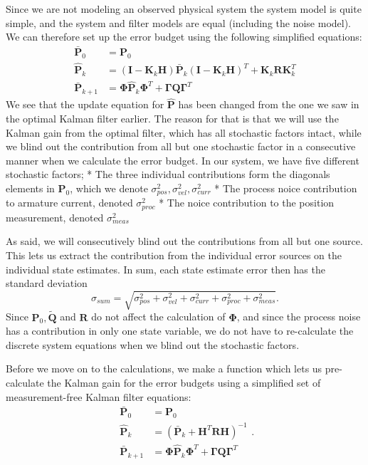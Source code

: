\documentclass[11pt]{article}
\begin{document}
Since we are not modeling an observed physical system the system model
is quite simple, and the system and filter models are equal (including
the noise model). We can therefore set up the error budget using the
following simplified equations: \[
\begin{aligned}
\bar{\mathbf{P}}_0 &= \mathbf{P}_0 \\
\hat{\mathbf{P}}_k &= (\mathbf{I} - \mathbf{K}_k \mathbf{H}) \bar{\mathbf{P}}_k (\mathbf{I} - \mathbf{K}_k \mathbf{H})^T + \mathbf{K}_k \mathbf{R} \mathbf{K}_k^T \\
\bar{\mathbf{P}}_{k+1} &= \mathbf{\Phi} \hat{\mathbf{P}}_k \mathbf{\Phi}^T + \mathbf{\Gamma} \mathbf{Q} \mathbf{\Gamma}^T
\end{aligned}
\] We see that the update equation for \(\hat{\mathbf{P}}\) has been
changed from the one we saw in the optimal Kalman filter earlier. The
reason for that is that we will use the Kalman gain from the optimal
filter, which has all stochastic factors intact, while we blind out the
contribution from all but one stochastic factor in a consecutive manner
when we calculate the error budget. In our system, we have five
different stochastic factors; * The three individual contributions form
the diagonals elements in \(\mathbf{P}_0\), which we denote
\(\sigma_{pos}^2, \sigma_{vel}^2, \sigma_{curr}^2\) * The process noice
contribution to armature current, denoted \(\sigma_{proc}^2\) * The
noice contribution to the position measurement, denoted
\(\sigma_{meas}^2\)

As said, we will consecutively blind out the contributions from all but
one source. This lets us extract the contribution from the individual
error sources on the individual state estimates. In sum, each state
estimate error then has the standard deviation \[
\hat{\sigma}_{sum} = \sqrt{\sigma_{pos}^2 + \sigma_{vel}^2 + \sigma_{curr}^2 + \sigma_{proc}^2 + \sigma_{meas}^2}.
\] Since \(\mathbf{P}_0, \tilde{\mathbf{Q}}\) and \(\mathbf{R}\) do not
affect the calculation of \(\mathbf{\Phi}\), and since the process noise
has a contribution in only one state variable, we do not have to
re-calculate the discrete system equations when we blind out the
stochastic factors.

Before we move on to the calculations, we make a function which lets us
pre-calculate the Kalman gain for the error budgets using a simplified
set of measurement-free Kalman filter equations: \[
\begin{aligned}
\bar{\mathbf{P}}_0 &= \mathbf{P}_0 \\
\hat{\mathbf{P}}_k &= (\bar{\mathbf{P}}_k + \mathbf{H}^T \mathbf{RH})^{-1} \\
\bar{\mathbf{P}}_{k+1} &= \mathbf{\Phi} \hat{\mathbf{P}}_k \mathbf{\Phi}^T + \mathbf{\Gamma} \mathbf{Q} \mathbf{\Gamma}^T
\end{aligned}.
\]
\end{document}
